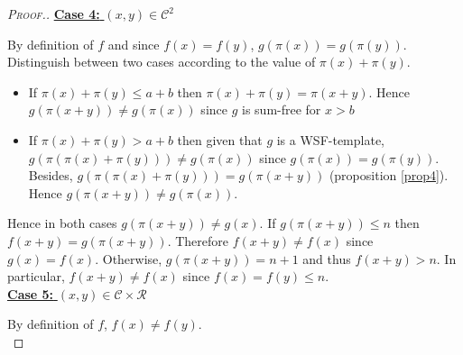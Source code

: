 \begin{proof}[\textsc{Proof.}]
\noindent \underline{\textbf{Case 4:} \((x,y) \in \mathcal{C}^2\)}
\par
By definition of \(f\) and since \(f(x)=f(y)\), \(g(\pi(x)) = g(\pi(y))\). Distinguish between two cases according 
to the value of \(\pi(x)+\pi(y)\).
\begin{itemize}
\item If \(\pi(x) + \pi(y) \leqslant a+b\) then \(\pi(x)+\pi(y) = \pi(x + y)\). Hence \(g(\pi(x + y)) \neq g(\pi(x))\) since 
	\(g\) is sum-free for \(x>b\)
\item \begin{sloppypar} 
	If \(\pi(x)+\pi(y)>a+b\) then given that \(g\) is a WSF-template, \({g(\pi(\pi(x)+\pi(y))) \neq g(\pi(x))}\) since 
	\({g(\pi(x)) = g(\pi(y))}\). Besides,  \({g(\pi(\pi(x)+\pi(y))) = g(\pi(x + y))}\) (proposition \ref{prop4}). Hence \({g(\pi(x + y)) 
	\neq  g(\pi(x))}\).
	\end{sloppypar}
\end{itemize}
\par
Hence in both cases \(g(\pi(x+y)) \neq g(x)\). If  \(g(\pi(x+y)) \leqslant n\) then \(f(x+y) = g(\pi(x+y))\). Therefore 
\(f(x+y) \neq f(x)\) since \(g(x) = f(x)\). Otherwise, \(g(\pi(x+y)) = n + 1\) and thus \(f(x+y) > n\). In particular, 
\(f(x + y) \neq f(x)\) since \(f(x) = f(y) \leqslant n\). \\

\noindent \underline{\textbf{Case 5:} \((x,y) \in \mathcal{C} \times \mathcal{R}\)}
\par
By definition of \(f\), \(f(x) \neq f(y)\).\\


\end{proof}
